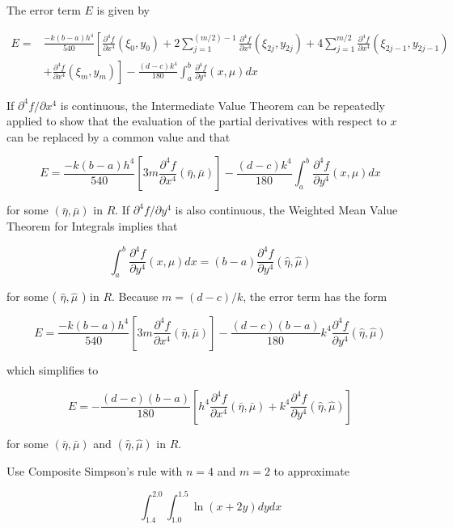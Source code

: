 The error term $E$ is given by

$$
\begin{aligned}
E= & \frac{-k(b-a) h^{4}}{540}\left[\frac{\partial^{4} f}{\partial x^{4}}\left(\xi_{0}, y_{0}\right)+2 \sum_{j=1}^{(m / 2)-1} \frac{\partial^{4} f}{\partial x^{4}}\left(\xi_{2 j}, y_{2 j}\right)+4 \sum_{j=1}^{m / 2} \frac{\partial^{4} f}{\partial x^{4}}\left(\xi_{2 j-1}, y_{2 j-1}\right)\right. \\
& \left.+\frac{\partial^{4} f}{\partial x^{4}}\left(\xi_{m}, y_{m}\right)\right]-\frac{(d-c) k^{4}}{180} \int_{a}^{b} \frac{\partial^{4} f}{\partial y^{4}}(x, \mu) d x
\end{aligned}
$$

If $\partial^{4} f / \partial x^{4}$ is continuous, the Intermediate Value Theorem can be repeatedly applied to show that the evaluation of the partial derivatives with respect to $x$ can be replaced by a common value and that

$$
E=\frac{-k(b-a) h^{4}}{540}\left[3 m \frac{\partial^{4} f}{\partial x^{4}}(\bar{\eta}, \bar{\mu})\right]-\frac{(d-c) k^{4}}{180} \int_{a}^{b} \frac{\partial^{4} f}{\partial y^{4}}(x, \mu) d x
$$

for some $(\bar{\eta}, \bar{\mu})$ in $R$. If $\partial^{4} f / \partial y^{4}$ is also continuous, the Weighted Mean Value Theorem for Integrals implies that

$$
\int_{a}^{b} \frac{\partial^{4} f}{\partial y^{4}}(x, \mu) d x=(b-a) \frac{\partial^{4} f}{\partial y^{4}}(\hat{\eta}, \hat{\mu})
$$

for some ( $\hat{\eta}, \hat{\mu}$ ) in $R$. Because $m=(d-c) / k$, the error term has the form

$$
E=\frac{-k(b-a) h^{4}}{540}\left[3 m \frac{\partial^{4} f}{\partial x^{4}}(\bar{\eta}, \bar{\mu})\right]-\frac{(d-c)(b-a)}{180} k^{4} \frac{\partial^{4} f}{\partial y^{4}}(\hat{\eta}, \hat{\mu})
$$

which simplifies to

$$
E=-\frac{(d-c)(b-a)}{180}\left[h^{4} \frac{\partial^{4} f}{\partial x^{4}}(\bar{\eta}, \bar{\mu})+k^{4} \frac{\partial^{4} f}{\partial y^{4}}(\hat{\eta}, \hat{\mu})\right]
$$

for some $(\bar{\eta}, \bar{\mu})$ and $(\hat{\eta}, \hat{\mu})$ in $R$.

\begin{example}\label{examp:multipleintegral1}
Use Composite Simpson's rule with $n=4$ and $m=2$ to approximate

$$
\int_{1.4}^{2.0} \int_{1.0}^{1.5} \ln (x+2 y) d y d x
$$
\end{example}

